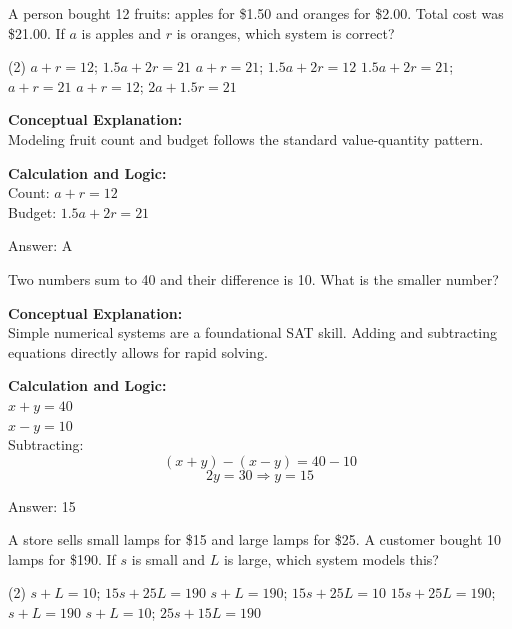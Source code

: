 \documentclass[11pt,paper=a4,answers]{exam}
\begin{document}
\begin{questions}
\question
A person bought 12 fruits: apples for \$1.50 and oranges for \$2.00. Total cost was \$21.00. If $a$ is apples and $r$ is oranges, which system is correct?
\begin{tasks}(2)
    \task $a + r = 12$; $1.5a + 2r = 21$
    \task $a + r = 21$; $1.5a + 2r = 12$
    \task $1.5a + 2r = 21$; $a + r = 21$
    \task $a + r = 12$; $2a + 1.5r = 21$
\end{tasks}

\begin{solution}
\textbf{Conceptual Explanation:} \\
Modeling fruit count and budget follows the standard value-quantity pattern.

\vspace{10pt}
\textbf{Calculation and Logic:} \\
Count: $a + r = 12$ \\
Budget: $1.5a + 2r = 21$

\vspace{15pt}
Answer: \colorbox{yellow!100}{A}
\end{solution}

\question
Two numbers sum to 40 and their difference is 10. What is the smaller number?

\begin{solution}
\textbf{Conceptual Explanation:} \\
Simple numerical systems are a foundational SAT skill. Adding and subtracting equations directly allows for rapid solving.

\vspace{10pt}
\textbf{Calculation and Logic:} \\
$x + y = 40$ \\
$x - y = 10$ \\
Subtracting:
\[(x + y) - (x - y) = 40 - 10\]
\[2y = 30 \Rightarrow y = 15\]

\vspace{15pt}
Answer: \colorbox{yellow!100}{15}
\end{solution}

\question
A store sells small lamps for \$15 and large lamps for \$25. A customer bought 10 lamps for \$190. If $s$ is small and $L$ is large, which system models this?
\begin{tasks}(2)
    \task $s + L = 10$; $15s + 25L = 190$
    \task $s + L = 190$; $15s + 25L = 10$
    \task $15s + 25L = 190$; $s + L = 190$
    \task $s + L = 10$; $25s + 15L = 190$
\end{tasks}


\end{questions}
\end{document}

